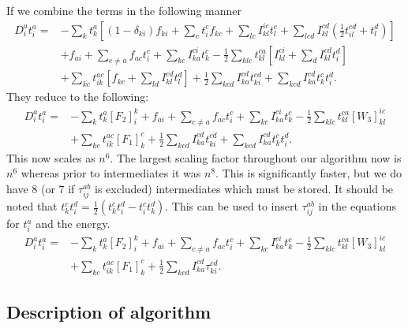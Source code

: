 \documentclass[graybox,sectrefs,envcountresetchap,open=right]{svmonodo}
\begin{document}
If we combine the terms in the following manner
\begin{align}
D_i^a t_i^a = &
- \sum_{k} t_k^a
\left[
(1 - \delta_{ki}) f_{ki}
+ \sum_c t_i^c
f_{kc}
+ \sum_{lc} I_{kl}^{ic} t_l^c
+ \sum_{lcd} I_{kl}^{cd} (\frac{1}{2} t_{il}^{cd} + t_l^d)
\right]
\nonumber \\ &
+ f_{ai} 
+ \sum_{c \not= a} f_{ac} t_i^c
+ \sum_{kc} I_{ka}^{ci} t_k^c 
- \frac{1}{2} \sum_{klc} t_{kl}^{ca}
\left[
I_{kl}^{ci} + \sum_d I_{kl}^{cd} t_i^d
\right]
\nonumber \\ &
+ \sum_{kc} t_{ik}^{ac} 
\left[
f_{kc} + \sum_{ld} I_{kl}^{cd} t_l^d
\right]
+ \frac{1}{2} \sum_{kcd} I_{ka}^{cd} t_{ki}^{cd} 
+ \sum_{kcd} I_{ka}^{cd} t_k^c t_i^d 
 .
\end{align}
They reduce to the following:
\begin{align}
D_i^a t_i^a = &
- \sum_{k} t_k^a
[F_2]_i^k
+ f_{ai} 
+ \sum_{c \not= a} f_{ac} t_i^c
+ \sum_{kc} I_{ka}^{ci} t_k^c 
- \frac{1}{2} \sum_{klc} t_{kl}^{ca} [W_3]_{kl}^{ic}
\nonumber \\ &
+ \sum_{kc} t_{ik}^{ac} [F_1]_k^c
+ \frac{1}{2} \sum_{kcd} I_{ka}^{cd} t_{ki}^{cd} 
+ \sum_{kcd} I_{ka}^{cd} t_k^c t_i^d 
 .
\end{align}
This now scales as $n^6$. The largest scaling factor throughout our algorithm now is $n^6$ whereas prior to intermediates it was $n^8$. This is significantly faster, but we do have 8 (or 7 if $\tau_{ij}^{ab}$ is excluded) intermediates which must be stored. It should be noted that $t_k^c t_i^d = \frac{1}{2} (t_k^c t_i^d - t_i^c t_k^d)$. This can be used to insert $\tau_{ij}^{ab}$ in the equations for $t_i^a$ and the energy. 
\begin{align}
D_i^a t_i^a = &
- \sum_{k} t_k^a
[F_2]_i^k
+ f_{ai} 
+ \sum_{c \not= a} f_{ac} t_i^c
+ \sum_{kc} I_{ka}^{ci} t_k^c 
- \frac{1}{2} \sum_{klc} t_{kl}^{ca} [W_3]_{kl}^{ic}
\nonumber \\ &
+ \sum_{kc} t_{ik}^{ac} [F_1]_k^c
+ \frac{1}{2} \sum_{kcd} I_{ka}^{cd} \tau_{ki}^{cd} 
.  \label{LINK_THIS_SHIT_1_T1}
\end{align}


\subsection{Description of algorithm}
\end{document}
